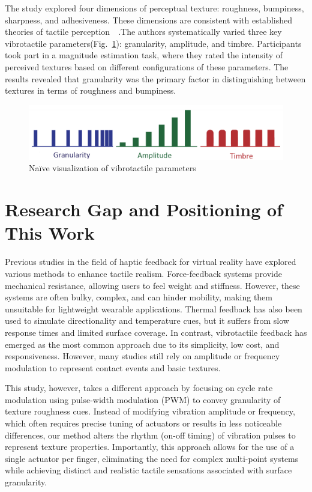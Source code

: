 The study explored four dimensions of perceptual texture: roughness, bumpiness, sharpness, and adhesiveness. These dimensions are consistent with established theories of tactile perception~~\cite{6216375}.The authors systematically varied three key vibrotactile parameters(Fig.~\ref{fig:Texture_Rendering_2}): granularity, amplitude, and timbre. Participants took part in a magnitude estimation task, where they rated the intensity of perceived textures based on different configurations of these parameters. The results revealed that granularity was the primary factor in distinguishing between textures in terms of roughness and bumpiness.

\begin{figure}[H]\centering
	\includegraphics[width=1\textwidth]{Pictures/Texture_Rendering_2.png}%
	\caption{Naïve visualization of vibrotactile parameters~\cite{10.1145/3025453.3025812}}\label{fig:Texture_Rendering_2}%
\end{figure}


\section{Research Gap and Positioning of This Work}
Previous studies in the field of haptic feedback for virtual reality have explored various methods to enhance tactile realism. Force-feedback systems provide mechanical resistance, allowing users to feel weight and stiffness. However, these systems are often bulky, complex, and can hinder mobility, making them unsuitable for lightweight wearable applications. Thermal feedback has also been used to simulate directionality and temperature cues, but it suffers from slow response times and limited surface coverage. In contrast, vibrotactile feedback has emerged as the most common approach due to its simplicity, low cost, and responsiveness. However, many studies still rely on amplitude or frequency modulation to represent contact events and basic textures.

This study, however, takes a different approach by focusing on cycle rate modulation using pulse-width modulation (PWM) to convey granularity of texture roughness cues. Instead of modifying vibration amplitude or frequency, which often requires precise tuning of actuators or results in less noticeable differences, our method alters the rhythm (on-off timing) of vibration pulses to represent texture properties. Importantly, this approach allows for the use of a single actuator per finger, eliminating the need for complex multi-point systems while achieving distinct and realistic tactile sensations associated with surface granularity.

